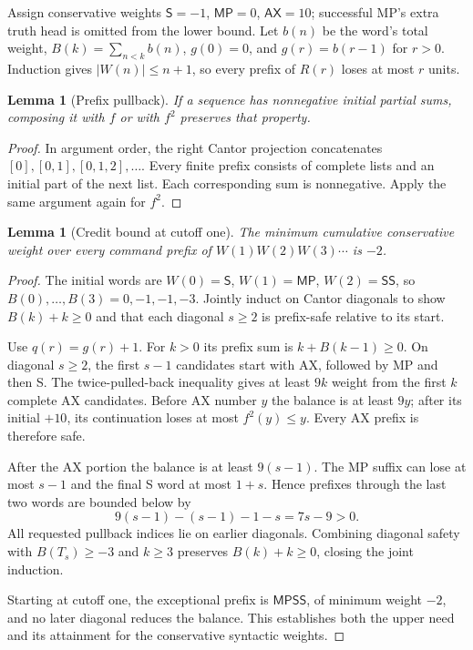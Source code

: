 \documentclass[11pt,a4paper]{article}
\newtheorem{lemma}[theorem]{Lemma}
\theoremstyle{definition}
\newcommand{\AX}{\mathsf{AX}}
\newcommand{\MP}{\mathsf{MP}}
\newcommand{\Tr}{\mathsf S}
\numberwithin{equation}{section}
\begin{document}
Assign conservative weights $\Tr=-1$, $\MP=0$, $\AX=10$; successful
MP's extra truth head is omitted from the lower bound. Let $b(n)$ be
the word's total weight, $B(k)=\sum_{n<k}b(n)$, $g(0)=0$, and
$g(r)=b(r-1)$ for $r>0$. Induction gives $|W(n)|\le n+1$, so every
prefix of $R(r)$ loses at most $r$ units.

\begin{lemma}[Prefix pullback]
If a sequence has nonnegative initial partial sums, composing it with
$f$ or with $f^2$ preserves that property.
\end{lemma}
\begin{proof}
In argument order, the right Cantor projection concatenates
$[0],[0,1],[0,1,2],\ldots$. Every finite prefix consists of complete
lists and an initial part of the next list. Each corresponding sum is
nonnegative. Apply the same argument again for $f^2$.
\end{proof}

\begin{lemma}[Credit bound at cutoff one]
The minimum cumulative conservative weight over every command prefix
of $W(1)W(2)W(3)\cdots$ is $-2$.
\end{lemma}
\begin{proof}
The initial words are $W(0)=\Tr$, $W(1)=\MP$, $W(2)=\Tr\Tr$,
so $B(0),\ldots,B(3)=0,-1,-1,-3$. Jointly induct on Cantor diagonals
to show $B(k)+k\ge0$ and that each diagonal $s\ge2$ is prefix-safe
relative to its start.

Use $q(r)=g(r)+1$. For $k>0$ its prefix sum is
$k+B(k-1)\ge0$. On diagonal $s\ge2$, the first $s-1$ candidates
start with AX, followed by MP and then S. The twice-pulled-back
inequality gives at least $9k$ weight from the first $k$ complete AX
candidates. Before AX number $y$ the balance is at least $9y$;
after its initial $+10$, its continuation loses at most
$f^2(y)\le y$. Every AX prefix is therefore safe.

After the AX portion the balance is at least $9(s-1)$. The MP suffix
can lose at most $s-1$ and the final S word at most $1+s$. Hence
prefixes through the last two words are bounded below by
\[
 9(s-1)-(s-1)-1-s=7s-9>0.
\]
All requested pullback indices lie on earlier diagonals. Combining
diagonal safety with $B(T_s)\ge-3$ and $k\ge3$ preserves
$B(k)+k\ge0$, closing the joint induction.

Starting at cutoff one, the exceptional prefix is
$\MP\Tr\Tr$, of minimum weight $-2$, and no later diagonal reduces
the balance. This establishes both the upper need and its attainment
for the conservative syntactic weights.
\end{proof}
\end{document}
